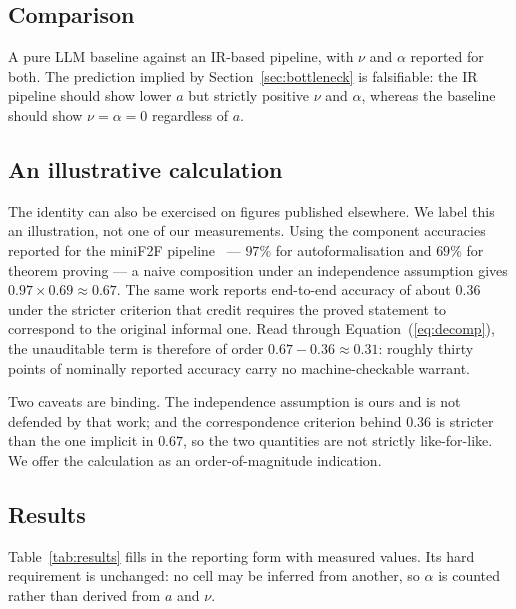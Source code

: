 \documentclass[11pt,a4paper]{article}
\begin{document}
\subsection{Comparison}
A pure LLM baseline against an IR-based pipeline, with $\nu$ and $\alpha$
reported for both.  The prediction implied by
Section~\ref{sec:bottleneck} is falsifiable: the IR pipeline should show lower
$a$ but strictly positive $\nu$ and $\alpha$, whereas the baseline should show
$\nu = \alpha = 0$ regardless of $a$.

\subsection{An illustrative calculation}
The identity can also be exercised on figures published elsewhere.  We label
this an illustration, not one of our measurements.  Using
the component accuracies reported for the miniF2F
pipeline~\cite{ospanov2025minif2f} --- $97\%$ for autoformalisation and $69\%$
for theorem proving --- a naive composition under an independence assumption
gives $0.97 \times 0.69 \approx 0.67$.  The same work reports end-to-end
accuracy of about $0.36$ under the stricter criterion that credit requires the
proved statement to correspond to the original informal one.  Read through
Equation~(\ref{eq:decomp}), the unauditable term is therefore of order
$0.67 - 0.36 \approx 0.31$: roughly thirty points of nominally reported accuracy
carry no machine-checkable warrant.

Two caveats are binding.  The independence assumption is ours and is not
defended by that work; and the correspondence criterion behind $0.36$ is
stricter than the one implicit in $0.67$, so the two quantities are not strictly
like-for-like.  We offer the calculation as an order-of-magnitude indication.

\subsection{Results}
Table~\ref{tab:results} fills in the reporting form with measured values.  Its
hard requirement is unchanged: no cell may be inferred from another, so $\alpha$
is counted rather than derived from $a$ and $\nu$.
\end{document}
